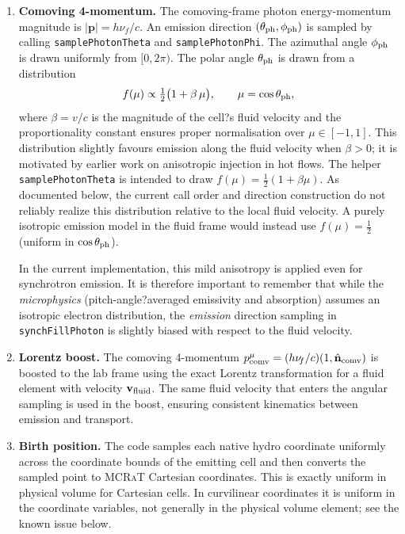 \documentclass[12pt,a4paper]{article}
\newcommand{\nuf}{\nu_{\!f}}
\newcommand{\code}[1]{\texttt{#1}}
\newcommand{\mcrat}{\textsc{MCRaT}}
\begin{document}
\begin{enumerate}[leftmargin=2em]
	\item \textbf{Comoving 4-momentum.}
	The comoving-frame photon energy-momentum magnitude is
	\(|\mathbf{p}| = h\nuf/c\). An emission direction
	\((\theta_{\rm ph}, \phi_{\rm ph})\) is sampled by calling
	\code{samplePhotonTheta} and \code{samplePhotonPhi}. The azimuthal
	angle \(\phi_{\rm ph}\) is drawn uniformly from \([0,2\pi)\). The
	polar angle \(\theta_{\rm ph}\) is drawn from a distribution
	\begin{equation}
		f(\mu) \propto \tfrac{1}{2}\bigl(1 + \beta\,\mu\bigr),
		\qquad \mu = \cos\theta_{\rm ph},
	\end{equation}
	where \(\beta = v/c\) is the magnitude of the cell?s fluid velocity
	and the proportionality constant ensures proper normalisation over
	\(\mu\in[-1,1]\). 
	This distribution slightly favours emission along
	the fluid velocity when \(\beta>0\); it is motivated by earlier work
	on anisotropic injection in hot flows. 
	The helper \code{samplePhotonTheta} is intended to draw
	$f(\mu)=\tfrac12(1+\beta\mu)$. As documented below, the current call
	order and direction construction do not reliably realize this
	distribution relative to the local fluid velocity.
	A purely isotropic emission
	model in the fluid frame would instead use
	\(f(\mu) = \tfrac{1}{2}\) (uniform in \(\cos\theta_{\rm ph}\)).
	
	In the current implementation, this mild anisotropy is applied even
	for synchrotron emission. It is therefore important to remember that
	while the \emph{microphysics} (pitch-angle?averaged emissivity and
	absorption) assumes an isotropic electron distribution, the
	\emph{emission} direction sampling in \code{synchFillPhoton} is slightly
	biased with respect to the fluid velocity.
	
	\item \textbf{Lorentz boost.}
	The comoving 4-momentum
	\(p^{\mu}_{\rm comv} = (h\nuf/c)(1,\hat{\mathbf{n}}_{\rm comv})\) is
	boosted to the lab frame using the exact Lorentz transformation for
	a fluid element with velocity \(\mathbf{v}_{\rm fluid}\). The same
	fluid velocity that enters the angular sampling is used in the
	boost, ensuring consistent kinematics between emission and
	transport.
	
	\item \textbf{Birth position.}
	The code samples each native hydro coordinate uniformly across the
	coordinate bounds of the emitting cell and then converts the sampled
	point to \mcrat{} Cartesian coordinates. This is exactly uniform in physical
	volume for Cartesian cells. In curvilinear coordinates it is uniform in
	the coordinate variables, not generally in the physical volume element;
	see the known issue below.
	

\end{enumerate}
\end{document}
